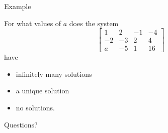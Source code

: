\documentclass{beamer}
\begin{document}
\begin{frame}{Example}
  \begin{example}
    For what values of $a$ does the system
    \begin{equation*}
      \left[
	\begin{array}{ccc|c}
          1&2&-1&-4\\
          -2&-3&2&4\\
          a&-5&1&16
	\end{array}
      \right]
    \end{equation*}
    have
    \begin{itemize}
    \item infinitely many solutions
    \item a unique solution
    \item no solutions.
    \end{itemize}
  \end{example}
\end{frame}

\begin{frame}
  Questions?
\end{frame}
\end{document}
